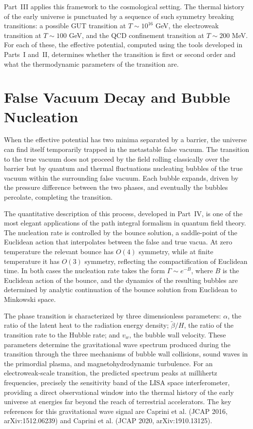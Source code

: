 Part~III applies this framework to the cosmological setting. The
thermal history of the early universe is punctuated by a sequence of
such symmetry breaking transitions: a possible GUT transition at
$T\sim 10^{16}$ GeV, the electroweak transition at $T\sim 100$ GeV,
and the QCD confinement transition at $T\sim 200$ MeV. For each of
these, the effective potential, computed using the tools developed in
Parts~I and~II, determines whether the transition is first or second
order and what the thermodynamic parameters of the transition are.

\section*{False Vacuum Decay and Bubble Nucleation}

When the effective potential has two minima separated by a barrier,
the universe can find itself temporarily trapped in the metastable
false vacuum. The transition to the true vacuum does not proceed by
the field rolling classically over the barrier but by quantum and
thermal fluctuations nucleating bubbles of the true vacuum within
the surrounding false vacuum. Each bubble expands, driven by the
pressure difference between the two phases, and eventually the bubbles
percolate, completing the transition.

The quantitative description of this process, developed in Part~IV,
is one of the most elegant applications of the path integral formalism
in quantum field theory. The nucleation rate is controlled by the
bounce solution, a saddle-point of the Euclidean action that
interpolates between the false and true vacua. At zero temperature
the relevant bounce has $O(4)$ symmetry, while at finite temperature
it has $O(3)$ symmetry, reflecting the compactification of Euclidean
time. In both cases the nucleation rate takes the form
$\Gamma \sim e^{-B}$, where $B$ is the Euclidean action of the bounce,
and the dynamics of the resulting bubbles are determined by analytic
continuation of the bounce solution from Euclidean to Minkowski space.

The phase transition is characterized by three dimensionless
parameters: $\alpha$, the ratio of the latent heat to the radiation
energy density; $\tilde\beta/H$, the ratio of the transition rate to
the Hubble rate; and $v_w$, the bubble wall velocity. These parameters
determine the gravitational wave spectrum produced during the
transition through the three mechanisms of bubble wall collisions,
sound waves in the primordial plasma, and magnetohydrodynamic
turbulence. For an electroweak-scale transition, the predicted
spectrum peaks at millihertz frequencies, precisely the sensitivity
band of the LISA space interferometer, providing a direct
observational window into the thermal history of the early universe
at energies far beyond the reach of terrestrial accelerators. The key
references for this gravitational wave signal are Caprini et al.
(JCAP 2016, arXiv:1512.06239) and Caprini et al. (JCAP 2020,
arXiv:1910.13125).

